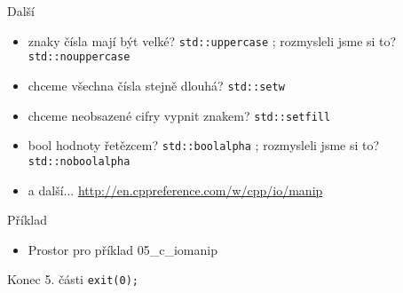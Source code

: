 \documentclass{beamer}
\begin{document}
\begin{xframe}{Další}
	\begin{itemize}
		\item znaky čísla mají být velké? \texttt{std::uppercase} ; rozmysleli jsme si to? \texttt{std::nouppercase}
		\item chceme všechna čísla stejně dlouhá? \texttt{std::setw}
		\item chceme neobsazené cifry vypnit znakem? \texttt{std::setfill}
		\item bool hodnoty řetězcem? \texttt{std::boolalpha} ; rozmysleli jsme si to? \texttt{std::noboolalpha}
		\item a další... \url{http://en.cppreference.com/w/cpp/io/manip}
	\end{itemize}
\end{xframe}

\begin{xframe}{Příklad}
	\begin{itemize}
		\item Prostor pro příklad 05\_c\_iomanip
	\end{itemize}
\end{xframe}



\begin{xframe}{Konec 5. části}
\texttt{exit(0);}
\end{xframe}
\end{document}
